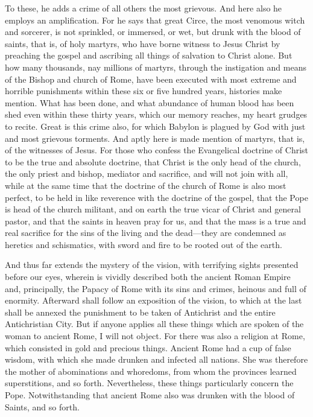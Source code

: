 To these, he adds a crime of all others the most grievous. And here also he employs an amplification. For he says that great Circe, the most venomous witch and sorcerer, is not sprinkled, or immersed, or wet, but drunk with the blood of saints, that is, of holy martyrs, who have borne witness to Jesus Christ by preaching the gospel and ascribing all things of salvation to Christ alone. But how many thousands, nay millions of martyrs, through the instigation and means of the Bishop and church of Rome, have been executed with most extreme and horrible punishments within these six or five hundred years, histories make mention. What has been done, and what abundance of human blood has been shed even within these thirty years, which our memory reaches, my heart grudges to recite. Great is this crime also, for which Babylon is plagued by God with just and most grievous torments. And aptly here is made mention of martyrs, that is, of the witnesses of Jesus. For those who confess the Evangelical doctrine of Christ to be the true and absolute doctrine, that Christ is the only head of the church, the only priest and bishop, mediator and sacrifice, and will not join with all, while at the same time that the doctrine of the church of Rome is also most perfect, to be held in like reverence with the doctrine of the gospel, that the Pope is head of the church militant, and on earth the true vicar of Christ and general pastor, and that the saints in heaven pray for us, and that the mass is a true and real sacrifice for the sins of the living and the dead—they are condemned as heretics and schismatics, with sword and fire to be rooted out of the earth.

And thus far extends the mystery of the vision, with terrifying sights presented before our eyes, wherein is vividly described both the ancient Roman Empire and, principally, the Papacy of Rome with its sins and crimes, heinous and full of enormity. Afterward shall follow an exposition of the vision, to which at the last shall be annexed the punishment to be taken of Antichrist and the entire Antichristian City. But if anyone applies all these things which are spoken of the woman to ancient Rome, I will not object. For there was also a religion at Rome, which consisted in gold and precious things. Ancient Rome had a cup of false wisdom, with which she made drunken and infected all nations. She was therefore the mother of abominations and whoredoms, from whom the provinces learned superstitions, and so forth. Nevertheless, these things particularly concern the Pope. Notwithstanding that ancient Rome also was drunken with the blood of Saints, and so forth.

